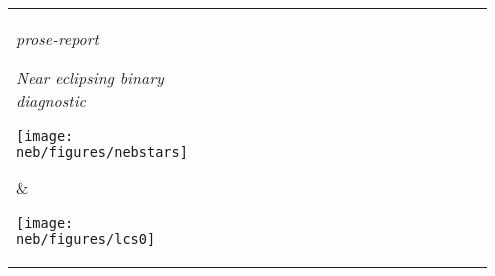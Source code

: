 {\selectfont

\begin{tabular}{m{0.3\linewidth}m{0.65\linewidth}}
  \parbox{\linewidth}{
    {\textcolor{gray!50}{\small\textit{prose-report}}}

    \vspace{0.2cm}
    {\LARGE {}}

    \vspace{-0.1cm}
    {\footnotesize\textit{Near eclipsing binary diagnostic}}


    \mbox{\hspace{-0.7cm}\texttt{[image: neb/figures/nebstars]}}
    \vspace{-1cm}\newline

  } & \hspace{0.7cm}\parbox{\linewidth}{
    \mbox{\hspace{-1cm}\texttt{[image: neb/figures/lcs0]}}
  } \\
\end{tabular}
}